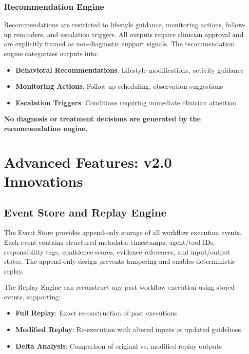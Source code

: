 \documentclass[journal]{IEEEtran}
\begin{document}
\subsubsection{Recommendation Engine}
Recommendations are restricted to lifestyle guidance, monitoring actions, follow-up reminders, and escalation triggers. All outputs require clinician approval and are explicitly framed as non-diagnostic support signals. The recommendation engine categorizes outputs into:

\begin{itemize}
    \item \textbf{Behavioral Recommendations}: Lifestyle modifications, activity guidance
    \item \textbf{Monitoring Actions}: Follow-up scheduling, observation suggestions
    \item \textbf{Escalation Triggers}: Conditions requiring immediate clinician attention
\end{itemize}

\textbf{No diagnosis or treatment decisions are generated by the recommendation engine.}

\newpage
\section{Advanced Features: v2.0 Innovations}

\subsection{Event Store and Replay Engine}
The Event Store provides append-only storage of all workflow execution events. Each event contains structured metadata: timestamps, agent/tool IDs, responsibility tags, confidence scores, evidence references, and input/output states. The append-only design prevents tampering and enables deterministic replay.

The Replay Engine can reconstruct any past workflow execution using stored events, supporting:
\begin{itemize}
    \item \textbf{Full Replay}: Exact reconstruction of past executions
    \item \textbf{Modified Replay}: Re-execution with altered inputs or updated guidelines
    \item \textbf{Delta Analysis}: Comparison of original vs. modified replay outputs
\end{itemize}
\end{document}
